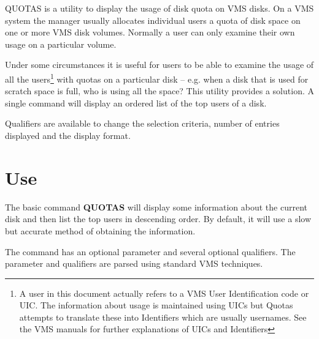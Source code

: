 QUOTAS is a utility to display the usage of disk quota on VMS disks.
On a VMS system the manager usually allocates individual users a quota
of disk space on one or more VMS disk volumes.
Normally a user can only examine their own usage on a particular volume.

Under some circumstances it is useful for users to be able to examine the
usage of all the users\footnote{
 A user in this document actually refers to a VMS User Identification code
 or UIC.
The information about usage is maintained using UICs but Quotas attempts to
translate these into Identifiers which are usually usernames.
See the VMS manuals for further explanations of UICs and Identifiers}
with quotas on a particular disk -- e.g. when a
disk that is used for scratch space is full, who is using all the space?
This utility provides a solution.
A single command will display an ordered list of the top users of a 
disk.

Qualifiers are available to change the selection criteria, number of entries
displayed and the display format.

\section{Use}

The basic command {\bf QUOTAS} will display some information about the
current disk and then list the top users in descending order. By default,
it will use a slow but accurate method of obtaining the information.

The command has an optional parameter and several optional qualifiers.
The parameter and qualifiers are parsed using standard VMS techniques.

